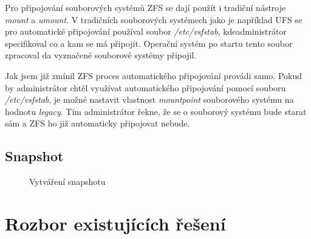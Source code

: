     Pro připojování souborových systémů ZFS se dají použít i tradiční nástroje \emph{mount} a \emph{umount}. V tradičních souborových systémech jako je například UFS se pro automatické připojování používal soubor \emph{/etc/vsfstab}, kdeadministrátor specifikoval co a kam se má připojit. Operační systém po startu tento soubor zpracoval da vyznačené souborové systémy připojil.
    
    Jak jsem již zmínil ZFS proces automatického připojování provádi samo. Pokud by administrátor chtěl využívat automatického připojování pomocí souboru \emph{/etc/vsfstab}, je možné nastavit vlastnost \emph{mountpoint} souborového systému na hodnotu \emph{legacy}. Tím administrátor řekne, že se o souborový systému bude starat sám a ZFS ho již automaticky připojovat nebude. 
    \subsection{Snapshot}
    \label{snapshot}
    \begin{figure}[h]
        \caption{Vytváření snapshotu}
        \label{snapshot}
    \end{figure}
\section{Rozbor existujících řešení}

